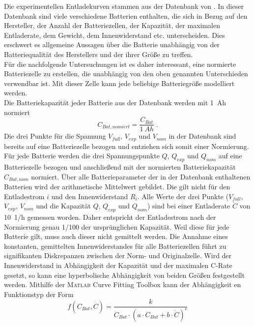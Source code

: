 Die experimentellen Entladekurven stammen aus der Datenbank von \cite{elektromodellflug}. In dieser Datenbank sind viele verschiedene Batterien enthalten, die sich in Bezug auf den Hersteller, der Anzahl der Batteriezellen, der Kapazität, der maximalen Entladerate, dem Gewicht, dem Innenwiderstand etc. unterscheiden. Dies erschwert es allgemeine Aussagen über die Batterie unabhängig von der Batteriequalität des Herstellers und der ihrer Größe zu treffen. \\
Für die nachfolgende Untersuchungen ist es daher interessant, eine normierte Batteriezelle zu erstellen, die unabhängig von den oben genannten Unterschieden verwendbar ist. Mit dieser Zelle kann jede beliebige Batteriegröße modelliert werden. \\
Die Batteriekapazität jeder Batterie aus der Datenbank werden mit \SI{1}{Ah} normiert
\begin{equation}
	C_{Bat,nomiert} = \frac{C_{Bat}}{\SI{1}{Ah}}\; .
\end{equation} 
Die drei Punkte für die Spannung \ensuremath{V_{full}}, \ensuremath{V_{exp}} und \ensuremath{V_{nom}} in der Datenbank sind bereits auf eine Batteriezelle bezogen und entziehen sich somit einer Normierung. 
Für jede Batterie werden die drei Spannungspunkte \ensuremath{Q}, \ensuremath{Q_{exp}} und \ensuremath{Q_{nom}} auf eine Batteriezelle bezogen und anschließend mit der normierten Batteriekapazität \ensuremath{C_{Bat,nom}} normiert. 
Über alle Batterieparameter der in der Datenbank enthaltenen Batterien wird der arithmetische Mittelwert gebildet. 
Die gilt nicht für den Entladestrom \ensuremath{i} und den Innenwiderstand \ensuremath{R_{i}}. Alle Werte der drei Punkte (\ensuremath{V_{full}}, \ensuremath{V_{exp}}, \ensuremath{V_{nom}} und die Kapazität \ensuremath{Q}, \ensuremath{Q_{exp}} und \ensuremath{Q_{nom}}) sind bei einer Entladerate \ensuremath{\dot{C}} von \SI{10}{1/h} gemessen worden. Daher entspricht der Entladestrom nach der Normierung genau 1/100 der ursprünglichen Kapazität.
Weil diese für jede Batterie gilt, muss auch dieser nicht gemittelt werden. 
Die Annahme eines konstanten, gemittelten Innenwiderstandes für alle Batteriezellen führt zu signifikanten Diskrepanzen zwischen der Norm- und Originalzelle. 
Wird der Innenwiderstand in Abhängigkeit der Kapazität und der maximalen C-Rate gesetzt, so kann eine hyperbolische Abhängigkeit von beiden Größen festgestellt werden. 
Mithilfe der \textsc{Matlab} Curve Fitting Toolbox kann der Abhängigkeit en Funktionstyp der Form
\begin{equation}
	f(C_{Bat},\dot{C}) = \frac{k}{C_{Bat}\cdot(a\cdot C_{Bat}+b\cdot \dot{C})^c}
\end{equation}
